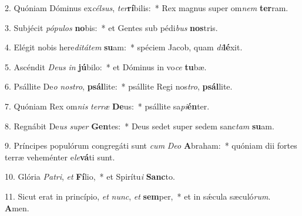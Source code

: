 2. Quóniam Dóminus ex\textit{cél}\textit{sus}, \textit{ter}\textbf{rí}bilis:~*  Rex magnus super om\textit{nem} \textbf{ter}ram.\

3. Subjécit \textit{pó}\textit{pu}\textit{los} \textbf{no}bis:~*  et Gentes sub pédi\textit{bus} \textbf{nos}tris.\

4. Elégit nobis here\textit{di}\textit{tá}\textit{tem} \textbf{su}am:~*  spéciem Jacob, quam \textit{di}\textbf{lé}xit.\

5. Ascéndit \textit{De}\textit{us} \textit{in} \textbf{jú}bilo:~*  et Dóminus in vo\textit{ce} \textbf{tu}bæ.\

6. Psállite De\textit{o} \textit{nos}\textit{tro}, \textbf{psál}lite:~*  psállite Regi nos\textit{tro}, \textbf{psál}lite.\

7. Quóniam Rex om\textit{nis} \textit{ter}\textit{ræ} \textbf{De}us:~*  psállite sa\textit{pi}\textbf{én}ter.\

8. Regnábit De\textit{us} \textit{su}\textit{per} \textbf{Gen}tes:~*  Deus sedet super sedem sanc\textit{tam} \textbf{su}am.\

9. Príncipes populórum congregáti sunt \textit{cum} \textit{De}\textit{o} \textbf{A}braham:~*  quóniam dii fortes terræ veheménter e\textit{le}\textbf{vá}ti sunt.\

10. Glória \textit{Pa}\textit{tri}, \textit{et} \textbf{Fí}lio,~*  et Spirítu\textit{i} \textbf{Sanc}to.\

11. Sicut erat in princípio, \textit{et} \textit{nunc}, \textit{et} \textbf{sem}per,~*  et in sǽcula sæculó\textit{rum}. \textbf{A}men.\

